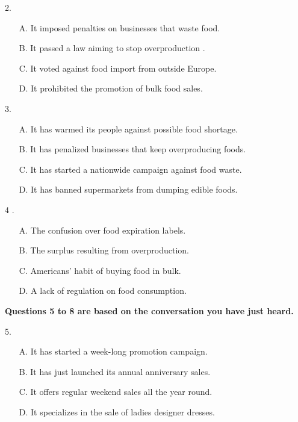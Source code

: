 \documentclass[UTF8,11pt]{ctexart}
\begin{document}
2.


\begin{itemize}[leftmargin=2em,itemsep=.2em,topsep=.4em]\item[A.] It imposed penalties on businesses that waste food.
\item[B.] It passed a law aiming to stop overproduction .
\item[C.] It voted against food import from outside Europe.
\item[D.] It prohibited the promotion of bulk food sales.
\end{itemize}

3.


\begin{itemize}[leftmargin=2em,itemsep=.2em,topsep=.4em]\item[A.] It has warmed its people against possible food shortage.
\item[B.] It has penalized businesses that keep overproducing foods.
\item[C.] It has started a nationwide campaign against food waste.
\item[D.] It has banned supermarkets from dumping edible foods.
\end{itemize}

4 .


\begin{itemize}[leftmargin=2em,itemsep=.2em,topsep=.4em]\item[A.] The confusion over food expiration labels.
\item[B.] The surplus resulting from overproduction.
\item[C.] Americans' habit of buying food in bulk.
\item[D.] A lack of regulation on food consumption.
\end{itemize}

\textbf{Questions 5 to 8 are based on the conversation you have just heard.}


5.


\begin{itemize}[leftmargin=2em,itemsep=.2em,topsep=.4em]\item[A.] It has started a week-long promotion campaign.
\item[B.] It has just launched its annual anniversary sales.
\item[C.] It offers regular weekend sales all the year round.
\item[D.] It specializes in the sale of ladies designer dresses.
\end{itemize}
\end{document}
